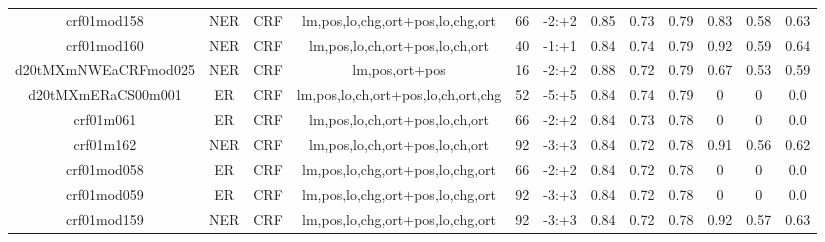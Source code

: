 \documentclass[a4paper]{article}
\begin{document}
\begin{landscape}
\begin{center}
\begin{tabular}{ |c|c|c|c|c|c|c|c|c|c|c|c|}
 	
 
 	
 		
 		\small{ crf01mod158 } & NER & CRF & lm,pos,lo,chg,ort+pos,lo,chg,ort  &  66 &  -2:+2  &  0.85 & 0.73 & 0.79  &  0.83 & 0.58 & 0.63 \\
 		

 	
 
 	
 		
 		\small{ crf01mod160 } & NER & CRF & lm,pos,lo,ch,ort+pos,lo,ch,ort  &  40 &  -1:+1  &  0.84 & 0.74 & 0.79  &  0.92 & 0.59 & 0.64 \\
 		

 	
 
 	
 		
 		\small{ d20tMXmNWEaCRFmod025 } & NER & CRF & lm,pos,ort+pos  &  16 &  -2:+2  &  0.88 & 0.72 & 0.79  &  0.67 & 0.53 & 0.59 \\
 		

 	
 
 	
 		
 		\small{ d20tMXmERaCS00m001 } & ER & CRF & lm,pos,lo,ch,ort+pos,lo,ch,ort,chg  &  52 &  -5:+5  &  0.84 & 0.74 & 0.79  &  0 & 0 & 0.0 \\
 		

 	
 
 	
 		
 		\small{ crf01m061 } & ER & CRF & lm,pos,lo,ch,ort+pos,lo,ch,ort  &  66 &  -2:+2  &  0.84 & 0.73 & 0.78  &  0 & 0 & 0.0 \\
 		

 	
 
 	
 		
 		\small{ crf01m162 } & NER & CRF & lm,pos,lo,ch,ort+pos,lo,ch,ort  &  92 &  -3:+3  &  0.84 & 0.72 & 0.78  &  0.91 & 0.56 & 0.62 \\
 		

 	
 
 	
 		
 		\small{ crf01mod058 } & ER & CRF & lm,pos,lo,chg,ort+pos,lo,chg,ort  &  66 &  -2:+2  &  0.84 & 0.72 & 0.78  &  0 & 0 & 0.0 \\
 		

 	
 
 	
 		
 		\small{ crf01mod059 } & ER & CRF & lm,pos,lo,chg,ort+pos,lo,chg,ort  &  92 &  -3:+3  &  0.84 & 0.72 & 0.78  &  0 & 0 & 0.0 \\
 		

 	
 
 	
 		
 		\small{ crf01mod159 } & NER & CRF & lm,pos,lo,chg,ort+pos,lo,chg,ort  &  92 &  -3:+3  &  0.84 & 0.72 & 0.78  &  0.92 & 0.57 & 0.63 \\
 		


\end{tabular}
\end{center}
\end{landscape}
\end{document}
